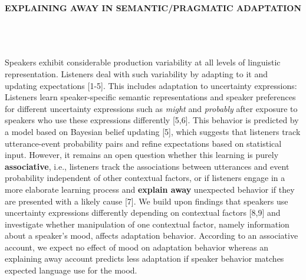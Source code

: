 \documentclass[11pt,a4paper]{article}
\begin{document}
\thispagestyle{empty}
\begin{center} \textbf{EXPLAINING AWAY IN SEMANTIC/PRAGMATIC ADAPTATION}  \\ \ 
\\ \ \\ \
\end{center} 

\vspace{-1.4em}
\noindent Speakers exhibit considerable production variability at all levels of linguistic representation. Listeners deal with such variability by adapting to it and updating expectations [1-5]. This includes adaptation to uncertainty expressions: Listeners learn speaker-specific semantic representations and speaker preferences for different uncertainty expressions such as \textit{might} and \textit{probably} after exposure to speakers who use these expressions differently [5,6]. This behavior is predicted by a model based on Bayesian belief updating [5], which suggests that listeners track utterance-event probability pairs and refine expectations based on statistical input. However, it remains an open question whether this learning is purely \textbf{associative}, i.e., listeners track the associations between utterances and event probability independent of other contextual factors, or if listeners engage in a more elaborate learning process and \textbf{explain away} unexpected behavior if they are presented with a likely cause [7].  We build upon findings that speakers use uncertainty expressions differently depending on contextual factors [8,9] and investigate whether manipulation of one contextual factor, namely information about a speaker's mood, affects adaptation behavior. According to an {associative} account, we expect no effect of mood on adaptation behavior whereas an {explaining away} account predicts less adaptation if speaker behavior matches expected language use for the mood. 
\end{document}
